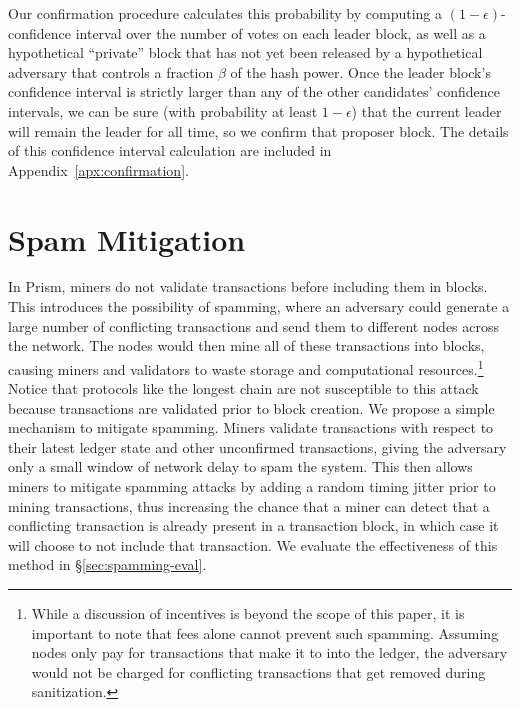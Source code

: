 Our confirmation procedure calculates this probability by computing a $(1-\epsilon)$-confidence interval over the number of votes on each leader block, as well as a hypothetical ``private'' block that has not yet been released by a hypothetical adversary that controls a fraction $\beta$ of the hash power. 
Once the leader block's confidence interval is strictly larger than any of the other candidates' confidence intervals, we can be sure (with probability at least $1-\epsilon$) that the current leader will remain the leader for all time, so we confirm that proposer block. 
The details of this confidence interval calculation are included in Appendix~\ref{apx:confirmation}.

\section{Spam Mitigation}
\label{sec:spamming-design}

In Prism, miners do not validate transactions before including them in blocks.
This introduces the possibility of spamming, where an adversary could generate a large number of conflicting transactions and send them to different nodes across the network.  
The nodes would then mine all of these transactions into blocks, causing miners and validators to waste storage  and computational  resources.\footnote{While a discussion of incentives is beyond the scope of this paper, it is important to note that fees alone cannot prevent such spamming. Assuming nodes only pay for transactions that make it to into the ledger, the adversary would not be charged for conflicting transactions that get removed during sanitization.}
Notice that protocols like the longest chain are not susceptible to this attack because transactions are validated prior to block creation. 
We propose a simple mechanism to mitigate spamming. Miners validate transactions with respect to their latest ledger state and other unconfirmed transactions, giving the adversary only a small window of network delay to spam the system. 
This then allows miners to mitigate spamming attacks by adding a random timing jitter prior to mining transactions, thus increasing the chance that a miner can detect that a conflicting transaction is already present in a transaction block, in  which case it will choose to not include that transaction.
We evaluate the effectiveness of this method in \S\ref{sec:spamming-eval}.



